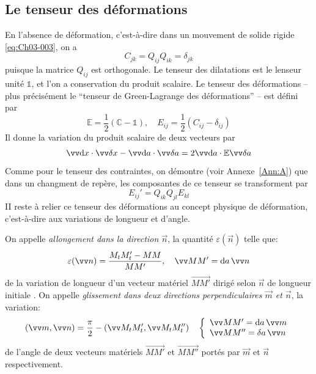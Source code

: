 \subsection{Le tenseur des déformations} \label{ssec:Ch03-1.2}
En l'absence de déformation, c'est-à-dire dans un mouvement de solide rigide \eqref{eq:Ch03-003}, on a
\begin{equation}
    C_{jk} = Q_{ij} Q_{ik} = \delta_{jk}
    \label{eq:Ch03-009}
\end{equation}
puisque la matrice $Q_{ij}$ est orthogonale.
Le tenseur des dilatations est le lenseur unité $\mathbb{1}$, et l'on a conservation du produit scalaire.
Le tenseur des déformations -- plus précisément le ``tenseur de Green-Lagrange des déformations'' -- est défini par
\begin{equation}
    \mathbb{E} = \frac{1}{2} \left( \mathbb{C} - \mathbb{1} \right), \quad E_{ij} = \frac{1}{2} \left( C_{ij} - \delta_{ij} \right)
    \label{eq:Ch03-010}
\end{equation}
Il donne la variation du produit scalaire de deux vecteurs par
\begin{equation}
    \vec{\ud x} \cdot \vec{\delta x} - \vec{\ud a} \cdot \vec{\delta a} = 2 \vec{\ud a} \cdot \mathbb{E} \vec{\delta a}
    \label{eq:Ch03-011}
\end{equation}
Comme pour le tenseur des contraintes, on démontre (voir Annexe~\ref{Ann:A}) que  dans  un  changment de repère, les composantes de  ce tenseur se transforment par
\begin{equation}
    E_{ij}' = Q_{ik} Q_{jl} E_{kl}
    \label{eq:Ch03-012}
\end{equation}
II reste à relier ce tenseur des déformations au concept physique de déformation, c'est-à-dire aux variations de longueur et d'angle.
\begin{deff}
    On appelle \emph{allongement dans la direction $\vec{n}$}, la quantité $\varepsilon \left( \vec{n} \right)$ telle que:
    \begin{equation}
        \varepsilon(\vec{n}) = \frac{M_tM_t' -MM}{MM'}, \quad \vec{MM'} = \ud a\, \vec{n}
        \label{eq:Ch03-013}
    \end{equation}
    de la variation de longueur d'un vecteur matériel $\vec{MM'}$ dirigé selon $\vec{n}$ de longueur initiale .
    On appelle \emph{glissement dans deux directions perpendiculaires $\vec{m}$ et $\vec{n}$}, la variation:
    \begin{equation}
        \left( \vec{m}, \vec{n} \right) = \frac{\pi}{2} - \left( \vec{M_t M_t'}, \vec{M_tM_t''} \right) 
        \quad \left\{
        \begin{array}{l}
            \vec{MM'} = \ud a\, \vec{m} \\
            \vec{MM''} = \delta a\, \vec{n}
        \end{array}
        \right.
        \label{eq:Ch03-014}
    \end{equation}
    de l'angle de deux vecteurs matériels $\vec{MM'}$ et $\vec{MM''}$ port\'es par $\vec{m}$ et $\vec{n}$ respectivement.
\end{deff}
